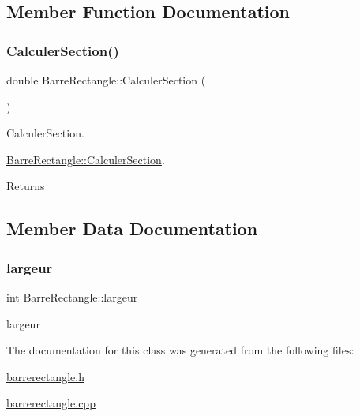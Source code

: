 \subsection{Member Function Documentation}
\mbox{\label{class_barre_rectangle_ad6a09075de8d270ea984f0c8fdc462c9}} 
\subsubsection{\texorpdfstring{Calculer\+Section()}{CalculerSection()}}
{\footnotesize\ttfamily double Barre\+Rectangle\+::\+Calculer\+Section (\begin{DoxyParamCaption}{ }\end{DoxyParamCaption})}



Calculer\+Section. 

\hyperlink{class_barre_rectangle_ad6a09075de8d270ea984f0c8fdc462c9}{Barre\+Rectangle\+::\+Calculer\+Section}.

\begin{DoxyReturn}{Returns}

\end{DoxyReturn}


\subsection{Member Data Documentation}
\mbox{\label{class_barre_rectangle_a6805bad77d9cbdf787a911e0841d6d35}} 
\subsubsection{\texorpdfstring{largeur}{largeur}}
{\footnotesize\ttfamily int Barre\+Rectangle\+::largeur\hspace{0.3cm}{\ttfamily [private]}}



largeur 



The documentation for this class was generated from the following files\+:\begin{DoxyCompactItemize}
\item 
\hyperlink{barrerectangle_8h}{barrerectangle.\+h}\item 
\hyperlink{barrerectangle_8cpp}{barrerectangle.\+cpp}\end{DoxyCompactItemize}
